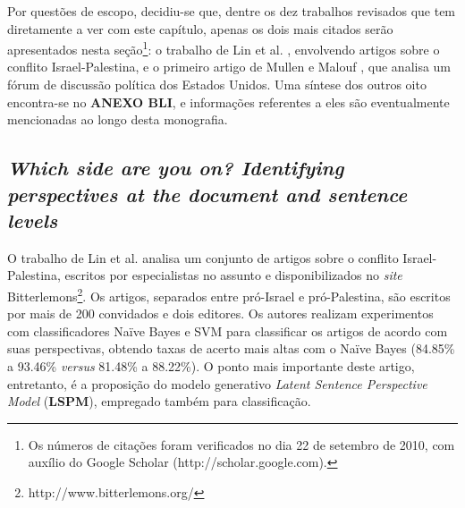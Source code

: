 
Por questões de escopo, decidiu-se que, dentre os dez trabalhos revisados que tem diretamente a ver com este capítulo, apenas os dois mais citados  serão apresentados nesta seção\footnote{Os números de citações foram verificados no dia 22 de setembro de 2010, com auxílio do Google Scholar (http://scholar.google.com).}: o trabalho de Lin et al. \cite{lin-et-al2006}, envolvendo artigos sobre o conflito Israel-Palestina, e o primeiro artigo de Mullen e Malouf \cite{aaai-politics}, que analisa um fórum de discussão política dos Estados Unidos. Uma síntese dos outros oito encontra-se no \textbf{ANEXO BLI}, e informações referentes a eles são eventualmente mencionadas ao longo desta monografia.

\subsection{\emph{Which side are you on? Identifying perspectives at the document and sentence levels}}
\label{sec:lin-et-al}

O trabalho de Lin et al. analisa um conjunto de artigos sobre o conflito Israel-Palestina, escritos por especialistas no assunto e disponibilizados no \emph{site} Bitterlemons\footnote{http://www.bitterlemons.org/}. Os artigos, separados entre pró-Israel e pró-Palestina, são escritos por mais de 200 convidados e dois editores. Os autores realizam experimentos com classificadores Naïve Bayes e SVM para classificar os artigos de acordo com suas perspectivas, obtendo taxas de acerto mais altas com o Naïve Bayes (84.85\% a 93.46\% \emph{versus} 81.48\% a 88.22\%). O ponto mais importante deste artigo, entretanto, é a proposição do modelo generativo \emph{Latent Sentence Perspective Model} (\textbf{LSPM}), empregado também para classificação. %

